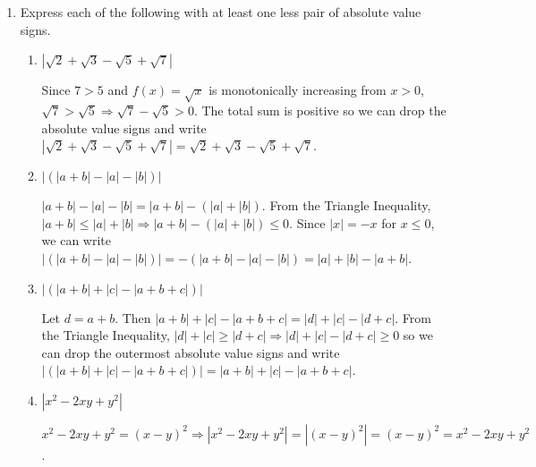 \documentclass[12pt]{article}
\newcommand{\then}{\Rightarrow}
\newcommand{\abs}[1]{|#1|}
\begin{document}
\begin{enumerate}
(P12) Let $0<x,y$. Applying P'13 with $a=0, b=x, c=y$, we have:
\begin{align}
		0\cdot y &< x\cdot y \tag{P'13}\\
             (x + (-x)) \cdot y &< x\cdot y \tag{P3}\\
		y \cdot (x + (-x)) &< x\cdot y \tag{P4}\\
		y\cdot x + y\cdot (-x) &< x\cdot y \tag{P9}\\
		y\cdot x + (-y\cdot x) &< x\cdot y \tag{P8}\\
		0 &< x\cdot y \tag{P3}\\
\end{align}
Therefore we've shown that when $0<x$ and $0<y$, we have $0<x\cdot y$, an equivalent statement to (P12).

\item Express each of the following with at least one less pair of absolute value signs.
\begin{enumerate}[label=(\roman*)]
\item $\abs{\sqrt{2}+\sqrt{3}-\sqrt{5}+\sqrt{7}}$

Since $7>5$ and $f(x)=\sqrt{x}$ is monotonically increasing from $x>0$, $\sqrt{7}>\sqrt{5} \then \sqrt{7}-\sqrt{5} > 0$. The total sum is positive so we can drop the absolute value signs and write $\abs{\sqrt{2}+\sqrt{3}-\sqrt{5}+\sqrt{7}}=\sqrt{2}+\sqrt{3}-\sqrt{5}+\sqrt{7}$.

\item $\abs{(\abs{a+b}-\abs{a}-\abs{b})}$

$\abs{a+b}-\abs{a}-\abs{b}=\abs{a+b}-(\abs{a}+\abs{b})$. From the Triangle Inequality, $\abs{a+b}\leq\abs{a}+\abs{b}\then\abs{a+b}-(\abs{a}+\abs{b})\leq 0$. Since $\abs{x}=-x$ for $x\leq 0$, we can write $\abs{(\abs{a+b}-\abs{a}-\abs{b})}=-(\abs{a+b}-\abs{a}-\abs{b})=\abs{a}+\abs{b}-\abs{a+b}$.

\item $\abs{(\abs{a+b}+\abs{c}-\abs{a+b+c})}$

Let $d=a+b$. Then $\abs{a+b}+\abs{c}-\abs{a+b+c}=\abs{d}+\abs{c}-\abs{d+c}$. From the Triangle Inequality, $\abs{d}+\abs{c}\geq\abs{d+c}\then\abs{d}+\abs{c}-\abs{d+c}\geq 0$ so we can drop the outermost absolute value signs and write $\abs{(\abs{a+b}+\abs{c}-\abs{a+b+c})}=\abs{a+b}+\abs{c}-\abs{a+b+c}$.

\item $\abs{x^2-2xy+y^2}$

$x^2-2xy+y^2=(x-y)^2\then \abs{x^2-2xy+y^2}=\abs{(x-y)^2}=(x-y)^2=x^2-2xy+y^2$.


\end{enumerate}
\end{enumerate}
\end{document}
